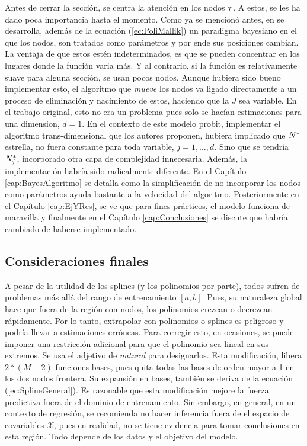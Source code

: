 \documentclass[../Main/Main.tex]{subfiles}
\begin{document}
Antes de cerrar la sección, se centra la atención en los nodos $\tau$. A estos, se les ha dado poca importancia hasta el momento. Como ya se mencionó antes, en \autocite{mallik1998automatic} se desarrolla, además de la ecuación (\ref{ec:PoliMallik}) un paradigma bayesiano en el que los nodos, son tratados como parámetros y por ende sus posiciones cambian. La ventaja de que estos estén indeterminados, es que se pueden concentrar en los lugares donde la función varia más. Y al contrario, si la función es relativamente suave para alguna sección, se usan pocos nodos. Aunque hubiera sido bueno implementar esto, el algoritmo que \textit{mueve} los nodos va ligado directamente a un proceso de eliminación y nacimiento de estos, haciendo que la $J$ sea variable. En el trabajo original, esto no era un problema pues solo se hacían estimaciones para una dimension, $d=1$. En el contexto de este modelo probit, implementar el algoritmo trans-dimensional que los autores proponen, hubiera implicado que $N^*$ estrella, no fuera constante para toda variable, $j = 1,\ldots,d$. Sino que se tendría $N^*_j$, incorporado otra capa de complejidad innecesaria. Además, la implementación habría sido radicalmente diferente. En el Capítulo \ref{cap:BayesAlgoritmo} se detalla como la simplificación de no incorporar los nodos como parámetros ayuda bastante a la velocidad del algoritmo. Posteriormente en el Capítulo \ref{cap:EjYRes}, se ve que para fines prácticos, el modelo funciona de maravilla y finalmente en el Capítulo \ref{cap:Conclusiones} se discute que habría cambiado de haberse implementado. \\

\subsection{Consideraciones finales}
A pesar de la utilidad de los splines (y los polinomios por parte), todos sufren de problemas más allá del rango de entrenamiento $[a,b]$. Pues, su naturaleza global hace que fuera de la región con nodos, los polinomios crezcan o decrezcan rápidamente. Por lo tanto, extrapolar con polinomios o splines es peligroso y podría llevar a estimaciones erróneas. Para corregir esto, en ocasiones, se puede imponer una restricción adicional para que el polinomio sea lineal en sus extremos. Se usa el adjetivo de \textit{natural} para designarlos. Esta modificación, libera $2*(M-2)$ funciones bases, pues quita todas las bases de orden mayor a 1 en los dos nodos frontera. Su expansión en bases, también se deriva de la ecuación (\ref{ec:SplineGeneral}). Es razonable que esta modificación mejore la fuerza predictiva fuera de el dominio de entrenamiento. Sin embargo, en general, en un contexto de regresión, se recomienda no hacer inferencia fuera de el espacio de covariables $\mathcal{X}$, pues en realidad, no se tiene evidencia para tomar conclusiones en esta región.  Todo depende de los datos y el objetivo del modelo.\\
\end{document}
